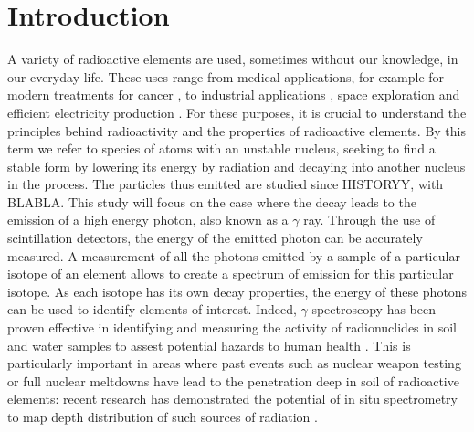 \section{Introduction}
A variety of radioactive elements are used, sometimes without our knowledge, in our everyday life.
These uses range from medical applications, for example for modern treatments for cancer \cite{andrea_galindo_what_2023}, to industrial applications \cite{ramadhany_assessment_2022}, space exploration \cite{klingelhofer_mossbauer_2004} and efficient electricity production \cite{andrea_galindo_what_2023}.
For these purposes, it is crucial to understand the principles behind radioactivity and the properties of radioactive elements.
By this term we refer to species of atoms with an unstable nucleus, seeking to find a stable form by lowering its energy by radiation and decaying into another nucleus in the process.
The particles thus emitted are studied since HISTORYY, with BLABLA.
This study will focus on the case where the decay leads to the emission of a high energy photon, also known as a \(\gamma\) ray.
Through the use of scintillation detectors, the energy of the emitted photon can be accurately measured.
A measurement of all the photons emitted by a sample of a particular isotope of an element allows to create a spectrum of emission for this particular isotope.
As each isotope has its own decay properties, the energy of these photons can be used to identify elements of interest.
Indeed, $\gamma$ spectroscopy has been proven effective in identifying and measuring the activity of radionuclides in soil and water samples to assest potential hazards to human health \cite{ramadhany_assessment_2022} \cite{kim_design_2022}.
This is particularly important in areas where past events such as nuclear weapon testing or full nuclear meltdowns have lead to the penetration deep in soil of radioactive elements: 
recent research has demonstrated the potential of in situ spectrometry to map depth distribution of such sources of radiation \cite{varley_situ_2017}.
